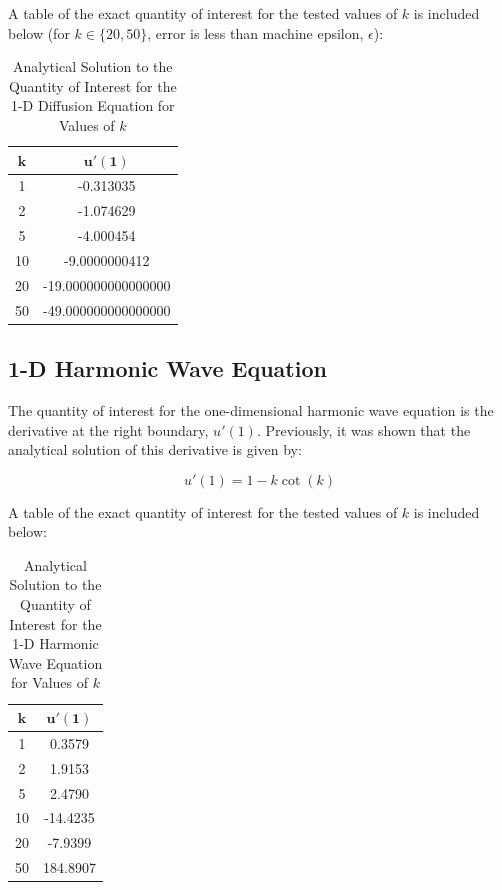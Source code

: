\documentclass[10pt]{article}		%
\numberwithin{equation}{section}
\begin{document}
A table of the exact quantity of interest for the tested values of $k$ is included below (for $k \in \{20, 50\}$, error is less than machine epsilon, $\epsilon$):
\begin{table}[H]
	\caption{Analytical Solution to the Quantity of Interest for the 1-D Diffusion Equation for Values of $k$}
	\begin{tabular}{|c|c|}
		\hline 
		$\mathbf{k}$ & $\mathbf{u'(1)}$ \\ 
		\hline 
		1 & -0.313035 \\ 
		\hline 
		2 & -1.074629 \\ 
		\hline 
		5 & -4.000454 \\ 
		\hline 
		10 & -9.0000000412 \\ 
		\hline 
		20 & -19.000000000000000 \\ 
		\hline 
		50 & -49.000000000000000 \\ 
		\hline 
	\end{tabular}
\end{table} 

\subsection{1-D Harmonic Wave Equation}

The quantity of interest for the one-dimensional harmonic wave equation is the derivative at the right boundary, $u'(1)$. Previously, it was shown that the analytical solution of this derivative is given by:

\begin{equation}
u'(1) = 1 - k\cot(k)
\end{equation}

A table of the exact quantity of interest for the tested values of $k$ is included below:
\begin{table}[H]
	\caption{Analytical Solution to the Quantity of Interest for the 1-D Harmonic Wave Equation for Values of $k$}
	\begin{tabular}{|c|c|}
		\hline 
		$\mathbf{k}$ & $\mathbf{u'(1)}$ \\ 
		\hline 
		1 & 0.3579 \\ 
		\hline 
		2 & 1.9153 \\ 
		\hline 
		5 & 2.4790 \\ 
		\hline 
		10 & -14.4235 \\ 
		\hline 
		20 & -7.9399 \\ 
		\hline 
		50 & 184.8907 \\ 
		\hline 
	\end{tabular}
\end{table} 
\end{document}
